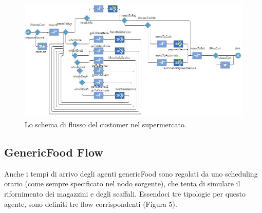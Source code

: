 \documentclass{article}
\begin{document}
\begin{center}
\begin{figure}[h]
\center
\label{custflow}
\includegraphics[scale=0.5]{./cust_flow.jpg}
\caption{\footnotesize{Lo schema di flusso del customer nel supermercato.}}
\end{figure}
\end{center}

\subsection{GenericFood Flow}
Anche i tempi di arrivo degli agenti genericFood sono regolati da uno scheduling orario (come sempre specificato nel nodo sorgente), che tenta di simulare il rifornimento dei magazzini e degli scaffali. Essendoci tre tipologie per questo agente, sono definiti tre flow corrispondenti (Figura 5).
\end{document}
